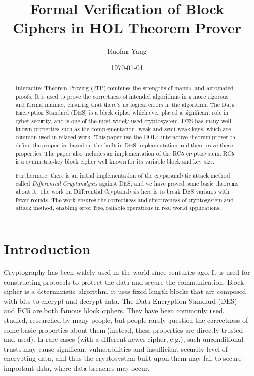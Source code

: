 \documentclass{article}
\title{Formal Verification of Block Ciphers in HOL Theorem Prover}
\author{Ruofan Yang}
\date{\today}
\begin{document}
\maketitle

\begin{abstract}
   Interactive Theorem Proving (ITP) combines the strengths of manual and automated proofs. It is used to prove the correctness of
   intended algorithms in a more rigorous and formal manner,
   ensuring that there's no logical errors in the algorithm. The Data
   Encryption Standard (DES) is a block cipher which ever played a
   significant role in cyber security, and is one of the most
   widely used cryptosystem. DES has many well known properties such
   as the complementation, weak and semi-weak keys, which are
   common used in related work. This paper use the HOL4
   interactive theorem prover to define the properties based
   on the built-in DES implementation and then prove these properties.
   The paper also includes an implementation of the RC5 cryptosystem.
   RC5 is a symmetric-key block cipher well known for
   its variable block and key size.

   Furthermore, there is an initial implementation of the crypatanalytic attack
   method called \emph{Differential Cryptanalysis} against DES, and
   we have proved some basic theorems about it.
   The work on Differential Cryptanalysis here is to break DES
   variants with fewer rounds. The work ensures
   the correctness and effectiveness of cryptosystem and attack
   method, enabling error-free, reliable operations in real-world applications.
\end{abstract}

\section{Introduction}
Cryptography has been widely used in the world since centuries ago. It
is used for constructing protocols to protect the
data and secure the communication. Block cipher is a deterministic algorithm. it uses
fixed-length blocks that are composed with bits to encrypt and decrypt data.
The Data Encryption Standard (DES)
and RC5 are both famous block ciphers. They have been commonly used,
studied, researched by
many people, but people rarely question the correctness of some basic
properties about them (instead, these properties are directly trusted
and used). In rare cases (with a different newer cipher, e.g.), such unconditional trusts may cause
significant vulnerabilities and insufficient security level of
encrypting data, and thus the cryptosystem built
upon them may fail to secure important data, where data breaches may occur.
\end{document}
